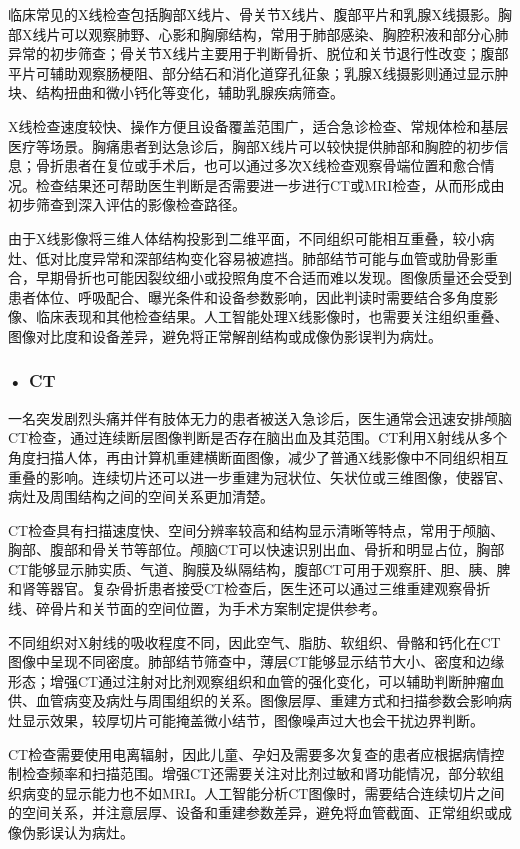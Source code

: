 临床常见的X线检查包括胸部X线片、骨关节X线片、腹部平片和乳腺X线摄影。胸部X线片可以观察肺野、心影和胸廓结构，常用于肺部感染、胸腔积液和部分心肺异常的初步筛查；骨关节X线片主要用于判断骨折、脱位和关节退行性改变；腹部平片可辅助观察肠梗阻、部分结石和消化道穿孔征象；乳腺X线摄影则通过显示肿块、结构扭曲和微小钙化等变化，辅助乳腺疾病筛查。

X线检查速度较快、操作方便且设备覆盖范围广，适合急诊检查、常规体检和基层医疗等场景。胸痛患者到达急诊后，胸部X线片可以较快提供肺部和胸腔的初步信息；骨折患者在复位或手术后，也可以通过多次X线检查观察骨端位置和愈合情况。检查结果还可帮助医生判断是否需要进一步进行CT或MRI检查，从而形成由初步筛查到深入评估的影像检查路径。

由于X线影像将三维人体结构投影到二维平面，不同组织可能相互重叠，较小病灶、低对比度异常和深部结构变化容易被遮挡。肺部结节可能与血管或肋骨影重合，早期骨折也可能因裂纹细小或投照角度不合适而难以发现。图像质量还会受到患者体位、呼吸配合、曝光条件和设备参数影响，因此判读时需要结合多角度影像、临床表现和其他检查结果。人工智能处理X线影像时，也需要关注组织重叠、图像对比度和设备差异，避免将正常解剖结构或成像伪影误判为病灶。

\subsubsection*{\textbf{• CT}}

一名突发剧烈头痛并伴有肢体无力的患者被送入急诊后，医生通常会迅速安排颅脑CT检查，通过连续断层图像判断是否存在脑出血及其范围。CT利用X射线从多个角度扫描人体，再由计算机重建横断面图像，减少了普通X线影像中不同组织相互重叠的影响。连续切片还可以进一步重建为冠状位、矢状位或三维图像，使器官、病灶及周围结构之间的空间关系更加清楚。

CT检查具有扫描速度快、空间分辨率较高和结构显示清晰等特点，常用于颅脑、胸部、腹部和骨关节等部位。颅脑CT可以快速识别出血、骨折和明显占位，胸部CT能够显示肺实质、气道、胸膜及纵隔结构，腹部CT可用于观察肝、胆、胰、脾和肾等器官。复杂骨折患者接受CT检查后，医生还可以通过三维重建观察骨折线、碎骨片和关节面的空间位置，为手术方案制定提供参考。

不同组织对X射线的吸收程度不同，因此空气、脂肪、软组织、骨骼和钙化在CT图像中呈现不同密度。肺部结节筛查中，薄层CT能够显示结节大小、密度和边缘形态；增强CT通过注射对比剂观察组织和血管的强化变化，可以辅助判断肿瘤血供、血管病变及病灶与周围组织的关系。图像层厚、重建方式和扫描参数会影响病灶显示效果，较厚切片可能掩盖微小结节，图像噪声过大也会干扰边界判断。

CT检查需要使用电离辐射，因此儿童、孕妇及需要多次复查的患者应根据病情控制检查频率和扫描范围。增强CT还需要关注对比剂过敏和肾功能情况，部分软组织病变的显示能力也不如MRI。人工智能分析CT图像时，需要结合连续切片之间的空间关系，并注意层厚、设备和重建参数差异，避免将血管截面、正常组织或成像伪影误认为病灶。


